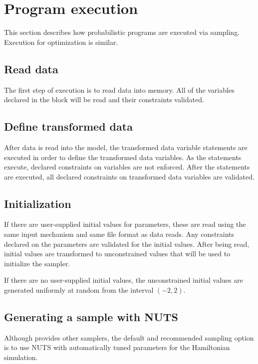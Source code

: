 \documentclass[article]{jss}
\begin{document}
\section[Program execution]{Program execution}

This section describes how  probabilistic programs are
executed via sampling.  Execution for optimization is similar.  

\subsection{Read data}

The first step of execution is to read data into memory.  All of the
variables declared in the  block will be read and their
constraints validated.  

\subsection{Define transformed data}

After data is read into the model, the transformed data variable
statements are executed in order to define the transformed data
variables.  As the statements execute, declared constraints on
variables are not enforced.  After the statements are executed, all
declared constraints on transformed data variables are validated.

\subsection{Initialization}

If there are user-supplied initial values for parameters, these are
read using the same input mechanism and same file format as data
reads.  Any constraints declared on the parameters are validated for
the initial values.  After being read, initial values are transformed
to unconstrained values that will be used to initialize the sampler.

If there are no user-supplied initial values, the unconstrained
initial values are generated uniformly at random from the interval
$(-2,2)$.

\subsection{Generating a sample with NUTS}

Although  provides other samplers, the default and
recommended sampling option is to use NUTS with automatically tuned
parameters for the Hamiltonian simulation.
\end{document}
